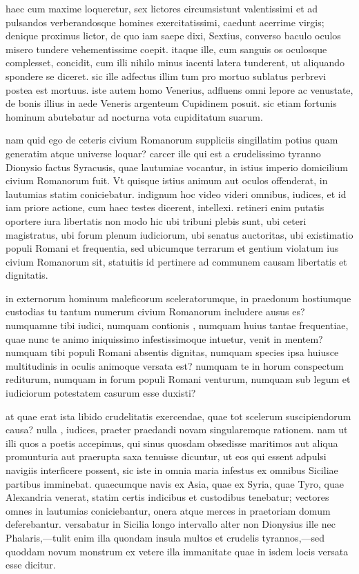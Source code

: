  haec cum maxime loqueretur, sex lictores circumsistunt valentissimi et ad pulsandos verberandosque homines exercitatissimi, caedunt acerrime virgis; denique proximus lictor, de quo iam saepe dixi, Sextius, converso baculo oculos misero tundere vehementissime coepit. itaque ille, cum sanguis os oculosque complesset, concidit, cum illi nihilo minus iacenti latera tunderent, ut aliquando spondere se diceret. sic ille adfectus illim tum pro mortuo sublatus perbrevi postea est mortuus. iste autem homo Venerius, adfluens omni lepore ac venustate, de bonis illius in aede Veneris argenteum Cupidinem posuit. sic etiam fortunis hominum abutebatur ad nocturna vota cupiditatum suarum.

 nam quid ego de ceteris civium Romanorum suppliciis singillatim potius quam generatim atque universe loquar? carcer ille qui est a crudelissimo tyranno Dionysio factus Syracusis, quae lautumiae vocantur, in istius imperio domicilium civium Romanorum fuit. Vt quisque istius animum aut oculos offenderat, in lautumias statim coniciebatur. indignum hoc video videri omnibus, iudices, et id iam priore actione, cum haec testes dicerent, intellexi. retineri enim putatis oportere iura libertatis non modo hic ubi tribuni plebis sunt, ubi ceteri magistratus, ubi forum plenum iudiciorum, ubi senatus auctoritas, ubi existimatio populi Romani et frequentia, sed ubicumque terrarum et gentium violatum ius civium Romanorum sit, statuitis id pertinere ad communem causam libertatis et dignitatis.

 in externorum hominum maleficorum sceleratorumque, in praedonum hostiumque custodias tu tantum numerum civium Romanorum includere ausus es? numquamne tibi iudici, numquam contionis , numquam huius tantae frequentiae, quae nunc te animo iniquissimo infestissimoque intuetur, venit in mentem? numquam tibi populi Romani absentis dignitas, numquam species ipsa huiusce multitudinis in oculis animoque versata est? numquam te in horum conspectum rediturum, numquam in forum populi Romani venturum, numquam sub legum et iudiciorum potestatem casurum esse duxisti?

 at quae erat ista libido crudelitatis exercendae, quae tot scelerum suscipiendorum causa? nulla , iudices, praeter praedandi novam singularemque rationem. nam ut illi quos a poetis accepimus, qui sinus quosdam obsedisse maritimos aut aliqua promunturia aut praerupta saxa tenuisse dicuntur, ut eos qui essent adpulsi navigiis interficere possent, sic iste in omnia maria infestus ex omnibus Siciliae partibus imminebat. quaecumque navis ex Asia, quae ex Syria, quae Tyro, quae Alexandria venerat, statim certis indicibus et custodibus tenebatur; vectores omnes in lautumias coniciebantur, onera atque merces in praetoriam domum deferebantur. versabatur in Sicilia longo intervallo alter non Dionysius ille nec Phalaris,—tulit enim illa quondam insula multos et crudelis tyrannos,—sed quoddam novum monstrum ex vetere illa immanitate quae in isdem locis versata esse dicitur.

